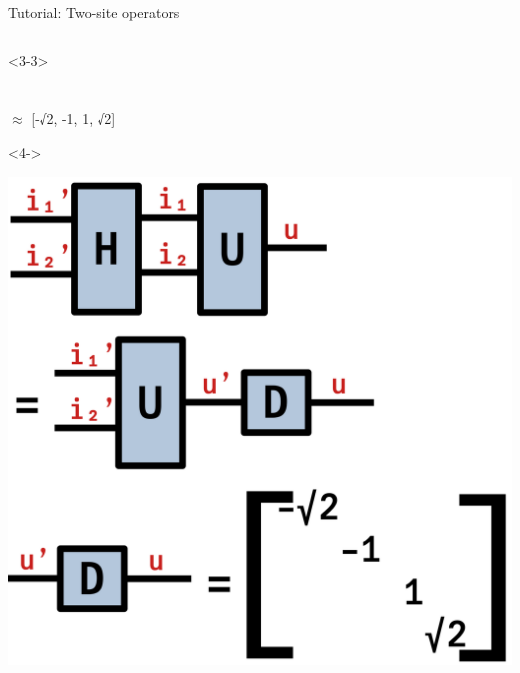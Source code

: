 \begin{frame}[fragile]{Tutorial: Two-site operators}
\begin{columns}
\begin{column}{5cm}
\begin{onlyenv}<3-3>
~\\
~\\
~\\
$\approx$ [-√2, -1, 1, √2]
\end{onlyenv}

\begin{onlyenv}<4->
\vspace*{0.0cm}
\begin{center}
\includegraphics[width=1.0\textwidth]{
  slides/assets/eigen_H.png
}
\end{center}
\vspace*{0.0cm}
\end{onlyenv}

\end{column}

\end{columns}

\end{frame}
